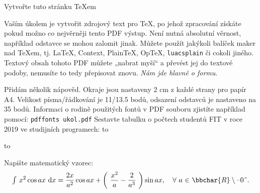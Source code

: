  

\tit Vytvořte tuto stránku \TeX{}em

Vaším úkolem je vytvořit zdrojový text pro \TeX{}, po jehož zpracování získáte pokud možno co nejvěrněji tento PDF výstup.
Není nutná absolutní věrnost, například odstavce se mohou zalomit jinak. Můžete použít jakýkoli balíček maker nad \TeX{}em, tj. \LaTeX{}, Context, Plain\TeX{}, Op\TeX{}, {\tt luacsplain} či cokoli jiného. Textový obsah tohoto PDF můžete „nabrat myší“ a převést jej do textové podoby, nemusíte to tedy přepisovat znovu. {\it Nám jde hlavně o formu}.
 
Přidám několik nápověd. Okraje jsou nastaveny 2 cm z každé strany pro papír A4. Velikost písma/řádkování je 11/13.5 bodů, odsazení odstavců je nastaveno na 35 bodů. Informaci o rodině použitých fontů v PDF souboru zjistíte například pomocí:
\medskip
{\tt pdffonts ukol.pdf}
\medskip
Sestavte tabulku o počtech studentů FIT v roce 2019 ve studijních programech:
\bigskip
\hbox to 
\bigskip

\hbox to 
\bigskip

Napište matematický vzorec:
$$
\textstyle{\int}\ \displaystyle x^2\cos a x\ {\rm d} x = {2x \over a^2} \cos ax + \left(\ {x^2 \over a} - {2 \over a ^3}\ \right) \sin ax,\kern 10pt\forall\ a\ {\tt\in}\ {\bbchar{R} \setminus {{\char`\{} {\rm 0} {\char`\}} } } .
$$

